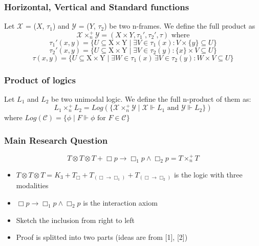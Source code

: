 \documentclass[hyperref={pdfpagelabels=false},t,10pt]{beamer}
\begin{document}
\begin{frame}
  \frametitle{Horizontal, Vertical and Standard functions}
  \begin{definition}
    Let $\mathcal{X}$ = ($X$, $\tau_1$) and $\mathcal{Y}$ = ($Y$, $\tau_2$) be two n-frames. We define the full product as
      $$\mathcal{X} \times_n^+  \mathcal{Y} = (X \times Y, \tau_1', \tau_2', \tau) \text{ where}$$
      $$ \tau_1'(x,y) = \{ U \subseteq \mbox{X} \times \mbox{Y} \mid \exists V \in \tau_1(x) : V \times  \{ y \} \subseteq U \}$$
      $$ \tau_2'(x,y) = \{ U \subseteq \mbox{X} \times \mbox{Y} \mid \exists V \in \tau_2(y) : \{ x \} \times V \subseteq U \}$$
          $$ \tau(x,y) = \{ U \subseteq \mbox{X} \times \mbox{Y} \mid \exists W \in \tau_1(x) \, \exists V \in \tau_2(y) : W \times V \subseteq U \}$$      
  \end{definition}

\end{frame}

\begin{frame}
  \frametitle{Product of logics }
  \begin{definition}
    Let $L_1$ and $L_2$ be two unimodal logic. We define the full n-product of them as:
    $$L_1 \times_n^+ L_2 =  Log(\{\mathcal{X} \times_n^+ \mathcal{Y} \mid \mathcal{X} \Vdash L_1 \text{ and } \mathcal{Y} \Vdash L_2 \})$$   
    where $Log(\mathcal{C}) = \{\phi \mid F \Vdash \phi \text{ for } F \in \mathcal{C}\}$
  \end{definition}


\end{frame}

\begin{frame}
  \frametitle{Main Research Question}
    \begin{theorem}
      $$T \otimes T \otimes T + \Box p \rightarrow \Box_1 p \land \Box_2 p = T \times_n^+ T$$
          \end{theorem}\pause


  \begin{itemize}
    \item $T \otimes T \otimes T = K_3 + T_{\Box} + T_{(\Box \rightarrow \Box_1)} + T_{(\Box \rightarrow \Box_2)}$ is the logic with three modalities 
    \item $\Box p \rightarrow \Box_1 p \land \Box_2 p$ is the interaction axiom \pause
    \item Sketch the inclusion from right to left
    \item Proof is splitted into two parts (ideas are from [1], [2])
  \end{itemize}
\end{frame}
\end{document}
